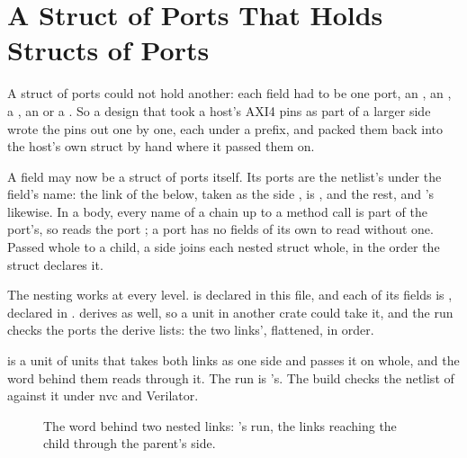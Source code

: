 \section{A Struct of Ports That Holds Structs of Ports}
\label{sec:x-nested}

A struct of ports could not hold another: each field had to be one
port, an , an , a , an  or a
. So a design that took a host's AXI4 pins as part of a
larger side wrote the pins out one by one, each under a prefix, and
packed them back into the host's own struct by hand where it passed
them on.

A field may now be a struct of ports itself. Its ports are the
netlist's under the field's name: the  link of the
 below, taken as the side , is
,  and the rest,
and 's likewise. In a body, every name of a chain up to a
method call is part of the port's, so 
reads the port ; a port has no fields of its own to
read without one. Passed whole to a child, a side joins each nested
struct whole, in the order the struct declares it.

The nesting works at every level.  is declared in this
file, and each of its fields is , declared in
.  derives  as well, so a
unit in another crate could take it, and the run checks the ports the
derive lists: the two links', flattened, in order.

 is a unit of units that takes both links as one side
and passes it on whole, and the word behind them reads through it.
The run is 's. The build checks the netlist of
 against it under nvc and Verilator.

\begin{figure}[htbp]
\centering

\caption{The word behind two nested links: 's run,
the links reaching the child through the parent's side.}
\label{fig:x-nested}
\end{figure}




